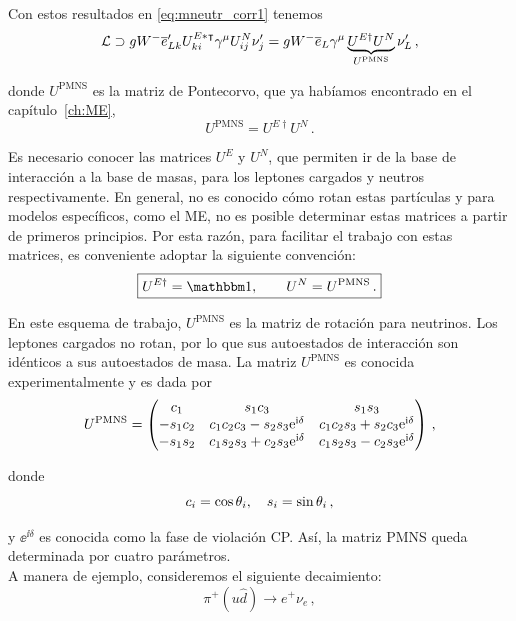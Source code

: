 Con estos resultados en \eqref{eq:mneutr_corr1} tenemos
%
\begin{equation}
	\mathcal{L} \supset g W^{-} \overline{e}'_{Lk} U^{E*\intercal}_{ki} \gamma^\mu U^N_{ij} \nu'_j = gW^{-} \overline{e}_L \gamma^\mu \underbrace{U^{E\dag} U^N}_{U^{\text{PMNS}}} \nu'_L \,,
\end{equation}

\noindent donde $U^{\text{PMNS}}$ es la matriz de Pontecorvo, que ya habíamos encontrado en el capítulo~\ref{ch:ME},
%
\begin{equation}
	U^\text{PMNS} = U^{E\dag} U^N \,.
\end{equation}

Es necesario conocer las matrices $U^E$ y $U^N$, que permiten ir de la base de interacción a la base de masas, para los leptones cargados y neutros respectivamente. En general, no es conocido cómo rotan estas partículas y para modelos específicos, como el ME, no es posible determinar estas matrices a partir de primeros principios. Por esta razón, para facilitar el trabajo con estas matrices, es conveniente adoptar la siguiente convención:
%
\begin{equation}
	\boxed{
	U^{E \dag} = \idnt \qc \quad U^N = U^\text{PMNS} \,.
	}
\end{equation}

En este esquema de trabajo, $U^\text{PMNS}$ es la matriz de rotación para neutrinos. Los leptones cargados no rotan, por lo que sus autoestados de interacción son idénticos a sus autoestados de masa. La matriz $U^\text{PMNS}$ es conocida experimentalmente y es dada por
%
\begin{equation}
	U^{\text{PMNS}} = \pmqty{
		c_1 & s_1 c_3 & s_1 s_3 \\
		-s_1 c_2 & c_1 c_2 c_3 - s_2 s_3 \ee^{\ii \delta} & c_1 c_2 s_3 + s_2 c_3 \ee^{\ii \delta} \\
		-s_1 s_2 & c_1 s_2 s_3 + c_2 s_3 \ee^{\ii \delta} & c_1 s_2 s_3 - c_2 s_3 \ee^{\ii \delta}
	} \,,
\end{equation}

\noindent donde
%
\begin{equation}
	c_i = \cos \theta_i \qc s_i = \sin \theta_i \,,
\end{equation}

\noindent y $\ee^{\ii \delta}$ es conocida como la fase de violación CP. Así, la matriz PMNS queda determinada por cuatro parámetros. \\

A manera de ejemplo, consideremos el siguiente decaimiento:
%
\begin{equation}
	\pi^+ (u \widehat{d}) \longrightarrow e^+ \nu_e \,,
\end{equation}

